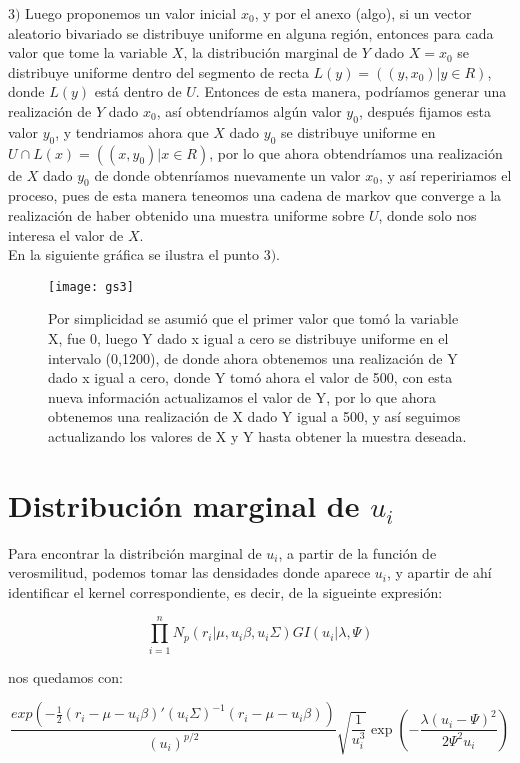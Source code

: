 \documentclass[11pt]{book}
\begin{document}
\bigskip
$3)$ Luego proponemos un valor inicial $x_{0}$, y por el anexo (algo), si un vector aleatorio bivariado se distribuye uniforme en alguna región, entonces para cada valor que tome la variable $X$, la distribución marginal de $Y$ dado $X=x_{0}$ se distribuye uniforme dentro del segmento de recta $L(y)=((y,x_{0}) | y\in R)$, donde $L(y)$ está dentro de $U$. Entonces de esta manera, podríamos generar una realización de $Y$ dado $x_{0}$, así obtendríamos algún valor $y_{0}$, después fijamos esta valor $y_{0}$, y tendriamos ahora que $X$ dado $y_{0}$ se distribuye uniforme en $U\cap  L(x)=((x,y_{0})|x\in R)$, por lo que ahora obtendríamos una realización de $X$ dado $y_{0}$ de donde obtenríamos nuevamente un valor $x_{0}$, y así repeririamos el proceso, pues de esta manera teneomos una cadena de markov que converge a la realización de haber obtenido una muestra uniforme sobre $U$, donde solo nos interesa el valor de $X$.\\
En la siguiente gráfica se ilustra el punto $3)$.
\begin{figure}[h]
\centering
\texttt{[image: gs3]}
\caption{Por simplicidad se asumió que el primer valor que tomó la variable X, fue 0, luego Y dado x igual a cero se distribuye uniforme en el intervalo (0,1200), de donde ahora obtenemos una realización de Y dado x igual a cero, donde Y tomó ahora el valor de 500, con esta nueva información actualizamos el valor de Y, por lo que ahora obtenemos una realización de X dado Y igual a 500, y así seguimos actualizando los valores de X y Y hasta obtener la muestra deseada.}
\label{fig:gs3}
\end{figure}

\section*{Distribución marginal de $u_{i}$}
Para encontrar la distribción marginal de $u_{i}$, a partir de la función de verosmilitud, podemos tomar las densidades donde aparece $u_{i}$, y apartir de ahí identificar el kernel correspondiente, es decir, de la sigueinte expresión:

\begin{equation*}
\prod_{i=1}^{n}N_{p}(r_{i}|\mu,u_{i}\beta,u_{i}\Sigma)GI(u_{i}|\lambda,\Psi)
\end{equation*}

nos quedamos con:

\begin{equation*}
\dfrac{exp(-\frac{1}{2}(r_{i}-\mu-u_{i}\beta)'(u_{i}\Sigma)^{-1}(r_{i}-\mu-u_{i}\beta))}{(u_{i})^{p/2}}\sqrt{\dfrac{1}{u_{i} ^{3}}}\exp(-\dfrac{\lambda(u_{i}-\Psi)^{2}}{2\Psi^{2}u_{i}})
\end{equation*}
\end{document}
